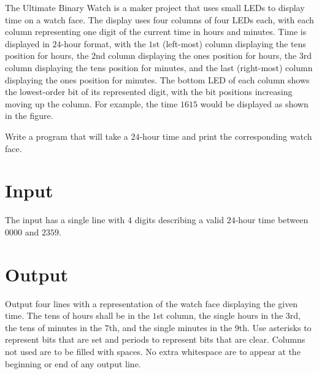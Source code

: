 
The Ultimate Binary Watch is a maker project that uses small LEDs to display time on a watch face. 
The display uses four columns of four LEDs each, with each column representing one digit of the current time in hours and minutes.
Time is displayed in $24$-hour format, with the $1$st (left-most) column displaying the tens position for hours,
the $2$nd column displaying the ones position for hours,
the $3$rd column displaying the tens position for minutes,
and the last (right-most) column displaying the ones position for minutes.
The bottom LED of each column shows the lowest-order bit of its represented digit, with the bit positions increasing moving up the column.
For example, the time $1615$ would be displayed as shown in the figure.

Write a program that will take a $24$-hour time and print the corresponding watch face.

\section*{Input}
The input has a single line with $4$ digits describing a valid $24$-hour time between $0000$ and $2359$.

\section*{Output}
Output four lines with a representation of the watch face displaying the given time. 
The tens of hours shall be in the $1$st column, the single hours in the $3$rd, the tens of minutes in the $7$th, and the single minutes in the $9$th. 
Use asterisks to represent bits that are set and periods to represent bits that are clear. 
Columns not used are to be filled with spaces. 
No extra whitespace are to appear at the beginning or end of any output line.
